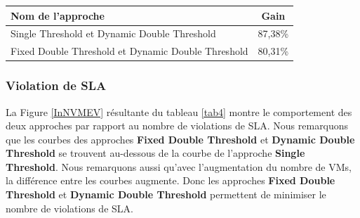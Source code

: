 \begin{onehalfspace}
\begin{center}
{\scriptsize   \begin{tabular}{|p{3.5cm}|c|}
\hline
      \centering      Nom de l’approche &  Gain\\
\hline
      \centering      Single Threshold et Dynamic Double Threshold&  87,38\%\\
\hline
      \centering      Fixed Double Threshold et Dynamic Double Threshold&  80,31\%\\
\hline
\end{tabular}}
\label{GAIN2}
\end{center}

\subsubsection{Violation de SLA}
La Figure \ref{InNVMEV} résultante du tableau \ref{tab4} montre le comportement des deux approches par rapport au nombre de violations de SLA. Nous remarquons que les courbes des approches \textbf{Fixed Double Threshold} et \textbf{Dynamic Double Threshold} se trouvent au-dessous de la courbe de l’approche \textbf{Single Threshold}. Nous remarquons aussi qu’avec l’augmentation du nombre de VMs, la différence entre les courbes augmente. Donc les approches \textbf{Fixed Double Threshold} et \textbf{Dynamic Double Threshold} permettent de minimiser le nombre de violations de SLA.


\end{onehalfspace}
